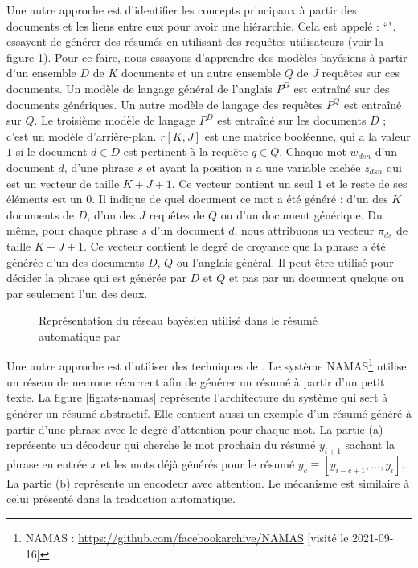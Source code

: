 \documentclass{KodeBook}
\begin{document}
Une autre approche est d'identifier les concepts principaux à partir des documents et les liens entre eux pour avoir une hiérarchie. 
Cela est appelé : ``". 
\citet{06-daumeiii-marcu} essayent de générer des résumés en utilisant des requêtes utilisateurs (voir la figure \ref{fig:ats-daumeii-marcu}). 
Pour ce faire, nous essayons d'apprendre des modèles bayésiens à partir d'un ensemble $D$ de $K$ documents et un autre ensemble $Q$ de $J$ requêtes sur ces documents. 
Un modèle de langage général de l'anglais $P^G$ est entraîné sur des documents génériques.
Un autre modèle de langage des requêtes $P^Q$ est entraîné sur $Q$. 
Le troisième modèle de langage $P^D$ est entraîné sur les documents $D$ ; c'est un modèle d'arrière-plan.
$r[K, J]$ est une matrice booléenne, qui a la valeur $1$ si le document $d \in D$ est pertinent à la requête $q \in Q$. 
Chaque mot $w_{dsn}$ d'un document $d$, d'une phrase $s$ et ayant la position $n$ a une variable cachée $z_{dsn}$ qui est un vecteur de taille $K+J+1$. 
Ce vecteur contient un seul $1$ et le reste de ses éléments est un $0$.
Il indique de quel document ce mot a été généré : d'un des $K$ documents de $D$, d'un des $J$ requêtes de $Q$ ou d'un document générique.
Du même, pour chaque phrase $s$ d'un document $d$, nous attribuons un vecteur $\pi_{ds}$ de taille $K+J+1$. 
Ce vecteur contient le degré de croyance que la phrase a été générée d'un des documents $D$, $Q$ ou l'anglais général.
Il peut être utilisé pour décider la phrase qui est générée par $D$ et $Q$ et pas par un document quelque ou par seulement l'un des deux.

\begin{figure}[!ht]
	\centering
	\caption[Représentation du réseau bayésien pour le résumé automatique]{Représentation du réseau bayésien utilisé dans le résumé automatique par \citet{06-daumeiii-marcu}}
	\label{fig:ats-daumeii-marcu}
\end{figure}

Une autre approche est d'utiliser des techniques de . 
Le système NAMAS\footnote{NAMAS : \url{https://github.com/facebookarchive/NAMAS} [visité le 2021-09-16]} \cite{15-rush-al} utilise un réseau de neurone récurrent afin de générer un résumé à partir d'un petit texte. 
La figure \ref{fig:ats-namas} représente l'architecture du système qui sert à générer un résumé abstractif. 
Elle contient aussi un exemple d'un résumé généré à partir d'une phrase avec le degré d'attention pour chaque mot.
La partie (a) représente un décodeur qui cherche le mot prochain du résumé $y_{i+1}$ sachant la phrase en entrée $x$ et les mots déjà générés pour le résumé $y_c \equiv [y_{i-c+1},\ldots, y_i]$. 
La partie (b) représente un encodeur avec attention. 
Le mécanisme est similaire à celui présenté dans la traduction automatique.
\end{document}
